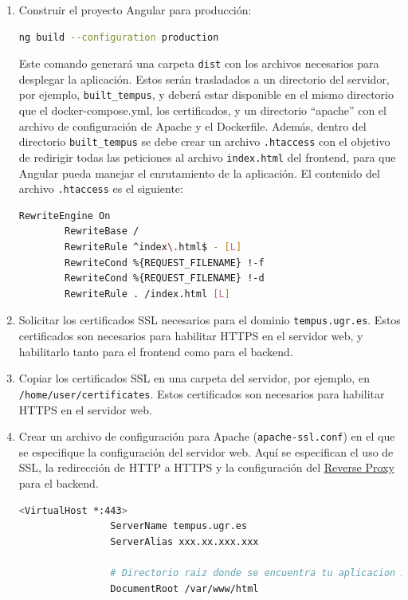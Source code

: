 \begin{enumerate}
    \item Construir el proyecto Angular para producción:
    \begin{lstlisting}[language=bash]
        ng build --configuration production
    \end{lstlisting}
    Este comando generará una carpeta \texttt{dist} con los archivos necesarios para desplegar la aplicación. Estos serán trasladados a un directorio del servidor, por ejemplo, \texttt{built\_tempus}, y deberá estar disponible en el mismo directorio que el docker-compose.yml, los certificados, y un directorio ``apache'' con el archivo de configuración de Apache y el Dockerfile.
    \newline
    Además, dentro del directorio \texttt{built\_tempus} se debe crear un archivo \texttt{.htaccess} con el objetivo de redirigir todas las peticiones al archivo \texttt{index.html} del frontend, para que Angular pueda manejar el enrutamiento de la aplicación. El contenido del archivo \texttt{.htaccess} es el siguiente:
    \begin{lstlisting}[language=bash]
        RewriteEngine On
        RewriteBase /
        RewriteRule ^index\.html$ - [L]
        RewriteCond %{REQUEST_FILENAME} !-f
        RewriteCond %{REQUEST_FILENAME} !-d
        RewriteRule . /index.html [L]
    \end{lstlisting}
    \item Solicitar los certificados SSL necesarios para el dominio \texttt{tempus.ugr.es}. Estos certificados son necesarios para habilitar HTTPS en el servidor web, y habilitarlo tanto para el frontend como para el backend.
    \item Copiar los certificados SSL en una carpeta del servidor, por ejemplo, en \texttt{/home/user/certificates}. Estos certificados son necesarios para habilitar HTTPS en el servidor web.
    \item Crear un archivo de configuración para Apache (\texttt{apache-ssl.conf}) en el que se especifique la configuración del servidor web.
          Aquí se especifican el uso de SSL, la redirección de HTTP a HTTPS y la configuración del \hyperlink{reverseproxy}{Reverse Proxy} para el backend.
        \begin{lstlisting}[language=bash] 
            <VirtualHost *:443>
                ServerName tempus.ugr.es
                ServerAlias xxx.xx.xxx.xxx

                # Directorio raiz donde se encuentra tu aplicacion Angular
                DocumentRoot /var/www/html


\end{lstlisting}
\end{enumerate}
